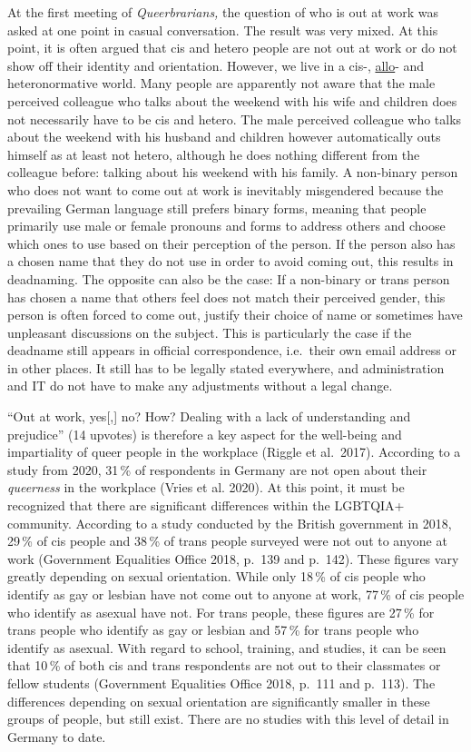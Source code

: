 \documentclass[a4paper,
fontsize=11pt,
oneside,
numbers=noperiodatend,
parskip=half-,
bibliography=totoc,
final
]{scrartcl}
\begin{document}
At the first meeting of \emph{Queerbrarians,} the question of who is out
at work was asked at one point in casual conversation. The result was
very mixed. At this point, it is often argued that cis and hetero people
are not out at work or do not show off their identity and orientation.
However, we live in a cis-, \href{https://lgbtqia.fandom.com/wiki/Allo}{allo}- and heteronormative world. Many people are
apparently not aware that the male perceived colleague who talks about
the weekend with his wife and children does not necessarily have to be
cis and hetero. The male perceived colleague who talks about the weekend
with his husband and children however automatically outs himself as at
least not hetero, although he does nothing different from the colleague
before: talking about his weekend with his family. A non-binary person
who does not want to come out at work is inevitably misgendered because
the prevailing German language still prefers binary forms, meaning that
people primarily use male or female pronouns and forms to address others
and choose which ones to use based on their perception of the person. If
the person also has a chosen name that they do not use in order to avoid
coming out, this results in deadnaming. The opposite can also be the
case: If a non-binary or trans person has chosen a name that others feel
does not match their perceived gender, this person is often forced to
come out, justify their choice of name or sometimes have unpleasant
discussions on the subject. This is particularly the case if the
deadname still appears in official correspondence, i.e.~their own email
address or in other places. It still has to be legally stated
everywhere, and administration and IT do not have to make any
adjustments without a legal change.

\enquote{Out at work, yes{[},{]} no? How? Dealing with a lack of understanding
and prejudice} (14 upvotes) is therefore a key aspect for the well-being
and impartiality of queer people in the workplace (Riggle et al.~2017).
According to a study from 2020, 31\,\% of respondents in Germany are not
open about their \emph{queerness} in the workplace (Vries et al. 2020).
At this point, it must be recognized that there are significant
differences within the LGBTQIA+ community. According to a study
conducted by the British government in 2018, 29\,\% of cis people and 38\,\%
of trans people surveyed were not out to anyone at work (Government
Equalities Office 2018, p.~139 and p.~142). These figures vary greatly
depending on sexual orientation. While only 18\,\% of cis people who
identify as gay or lesbian have not come out to anyone at work, 77\,\% of
cis people who identify as asexual have not. For trans people, these
figures are 27\,\% for trans people who identify as gay or lesbian and
57\,\% for trans people who identify as asexual. With regard to school,
training, and studies, it can be seen that 10\,\% of both cis and trans
respondents are not out to their classmates or fellow students
(Government Equalities Office 2018, p.~111 and p.~113). The differences
depending on sexual orientation are significantly smaller in these
groups of people, but still exist. There are no studies with this level
of detail in Germany to date.
\end{document}
